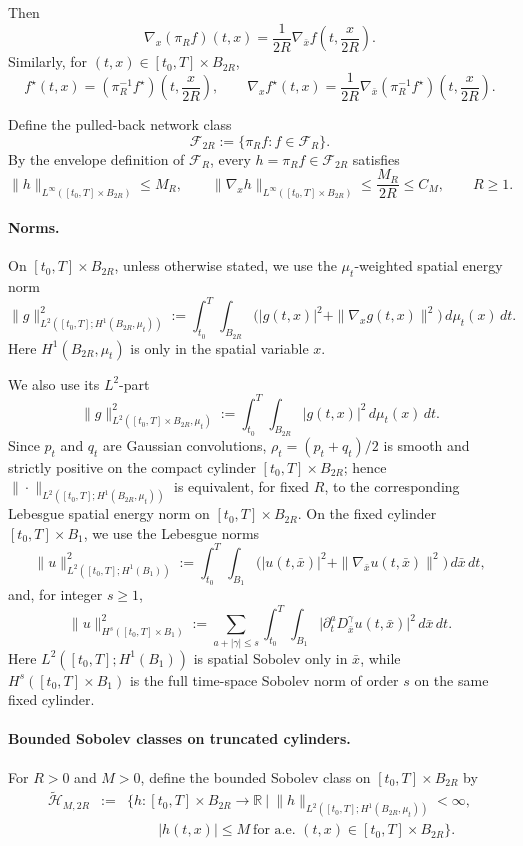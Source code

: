 \documentclass[11pt]{article}
\theoremstyle{plain}
\theoremstyle{definition}
\theoremstyle{remark}
\begin{document}
Then
\[
\nabla_x(\pi_R f)(t,x)
=
\frac{1}{2R}
\nabla_{\bar x}f\!\left(t,\frac{x}{2R}\right).
\]
Similarly, for \((t,x)\in [t_0,T]\times B_{2R}\),
\[
f^\star(t,x)
=
(\pi_R^{-1}f^\star)\!\left(t,\frac{x}{2R}\right),
\qquad
\nabla_x f^\star(t,x)
=
\frac{1}{2R}
\nabla_{\bar x}(\pi_R^{-1}f^\star)\!\left(t,\frac{x}{2R}\right).
\]

Define the pulled-back network class
\[
\mathcal F_{2R}:=
\{\pi_R f:f\in\mathcal F_R\}.
\]
By the envelope definition of \(\mathcal F_R\), every
\(h=\pi_R f\in\mathcal F_{2R}\) satisfies
\[
\|h\|_{L^\infty([t_0,T]\times B_{2R})}\le M_R,
\qquad
\|\nabla_x h\|_{L^\infty([t_0,T]\times B_{2R})}
\le
\frac{M_R}{2R}
\le C_M,
\qquad R\ge1.
\]

\paragraph{Norms.}

On \([t_0,T]\times B_{2R}\), unless otherwise stated, we use
the \(\mu_t\)-weighted spatial energy norm
\begin{equation}
\label{eq:weighted-energy-norm-2R}
\|g\|_{L^2([t_0,T];H^1(B_{2R},\mu_t))}^2:=
\int_{t_0}^T\int_{B_{2R}}
\Big(|g(t,x)|^2+\|\nabla_xg(t,x)\|^2\Big)\,d\mu_t(x)\,dt.
\end{equation}
Here \(H^1(B_{2R},\mu_t)\) is only in the spatial variable \(x\).


We also use its \(L^2\)-part
\[
\|g\|_{L^2([t_0,T]\times B_{2R},\mu_t)}^2:=
\int_{t_0}^T\int_{B_{2R}} |g(t,x)|^2\,d\mu_t(x)\,dt.
\]
Since \(p_t\) and \(q_t\) are Gaussian convolutions,
\(\rho_t=(p_t+q_t)/2\) is smooth and strictly positive on the compact
cylinder \([t_0,T]\times B_{2R}\); hence
\(\|\cdot\|_{L^2([t_0,T];H^1(B_{2R},\mu_t))}\) is equivalent, for
fixed \(R\), to the corresponding Lebesgue spatial energy norm on
\([t_0,T]\times B_{2R}\).
On the fixed cylinder \([t_0,T]\times B_1\), we use the Lebesgue norms
\[
\|u\|_{L^2([t_0,T];H^1(B_1))}^2:=
\int_{t_0}^T\int_{B_1}
\Big(
|u(t,\bar x)|^2+\|\nabla_{\bar x}u(t,\bar x)\|^2
\Big)\,d\bar x\,dt,
\]
and, for integer \(s\ge1\),
\[
\|u\|_{H^s([t_0,T]\times B_1)}^2:=
\sum_{a+|\gamma|\le s}
\int_{t_0}^T\int_{B_1}
\big|
\partial_t^aD_{\bar x}^{\gamma}u(t,\bar x)
\big|^2\,d\bar x\,dt.
\]
Here \(L^2([t_0,T];H^1(B_1))\) is spatial Sobolev only in
\(\bar x\), while \(H^s([t_0,T]\times B_1)\) is the full
time-space Sobolev norm of order \(s\) on the same fixed cylinder.

\paragraph{Bounded Sobolev classes on truncated cylinders.}
For \(R>0\) and \(M>0\), define the bounded Sobolev class on \([t_0,T]\times B_{2R}\) by
\begin{eqnarray}
\label{eq:Htilde-M-2R-def}
\widetilde{\mathcal H}_{M,2R}&:=&
\Big\{
h:[t_0,T]\times B_{2R}\to\mathbb R
\ \Big|\
\|h\|_{L^2([t_0,T];H^1(B_{2R},\mu_t))}<\infty,\nonumber\\
&& \qquad \ |h(t,x)|\le M\ \text{for a.e. }(t,x)\in [t_0,T]\times B_{2R}
\Big\}.
\end{eqnarray}
\end{document}
